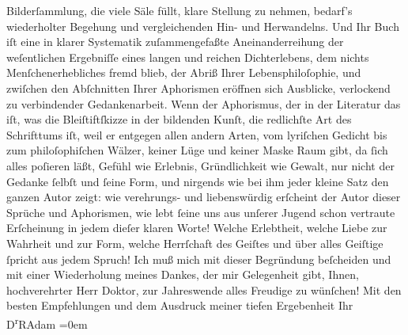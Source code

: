 \begin{ledgroupsized}[t]{13cm}
               Bilderſammlung, die viele Säle füllt, klare Stellung zu nehmen, bedarf’s wiederholter
               Begehung und vergleichenden Hin- und Herwandelns. Und Ihr Buch iſt eine in klarer
               Systematik zuſammengefaßte Aneinanderreihung der weſentlichen Ergebniſſe eines langen
               und reichen Dichterlebens, dem nichts Menſchenerhebliches fremd blieb, der Abriß
               Ihrer Lebensphiloſophie, und zwiſchen den Abſchnitten Ihrer Aphorismen eröffnen sich
               Ausblicke, verlockend zu verbindender Gedankenarbeit. Wenn der Aphorismus, der in der
               Literatur das iſt, was die Bleiſtiftſkizze in der bildenden Kunſt, die redlichſte Art
               des Schrifttums iſt, weil er entgegen allen andern Arten, vom lyriſchen Gedicht bis
               zum philoſophiſchen Wälzer, keiner Lüge und keiner Maske Raum  gibt, {\pb}da ſich alles poſieren läßt, Gefühl wie Erlebnis, Gründlichkeit wie Gewalt, nur
               nicht der Gedanke ſelbſt und ſeine Form, und nirgends wie bei ihm jeder kleine Satz
               den ganzen Autor zeigt: wie verehrungs- und liebenswürdig erſcheint der Autor dieser
               Sprüche und Aphorismen, wie lebt ſeine uns aus unſerer Jugend schon vertraute
               Erſcheinung in jedem dieſer klaren Worte! Welche Erlebtheit, welche Liebe zur
               Wahrheit und zur Form, welche Herrſchaft des Geiſtes und über alles Geiſtige ſpricht
               aus jedem Spruch!\pend
           \pstart
           Ich muß mich mit dieser Begründung beſcheiden und mit einer Wiederholung meines
               Dankes, der mir Gelegenheit gibt, Ihnen, hochverehrter Herr Doktor, zur Jahreswende
               alles Freudige zu wünſchen!\pend
           \pstart
           Mit den besten Empfehlungen und {\pb}dem
               Ausdruck meiner tiefen Ergebenheit\pend
           \pstart
           Ihr{\\[\baselineskip]}\spacefill\mbox{D\textsuperscript{r}RAdam}\pend
           \leftskip=0em{}
         
         \endnumbering{}\end{ledgroupsized}  \newcommand{\dateiname}{L02497}\newcommand{\titel}{Robert Adam an Arthur Schnitzler, 30. 12. 1927}\newcommand{\editorInnen}{Martin Anton Müller und Gerd-Hermann Susen}
      